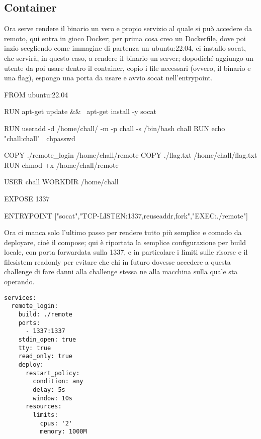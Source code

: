 \documentclass[main.tex]{subfiles}
\begin{document}
\subsection{Container}

Ora serve rendere il binario un vero e propio servizio al quale si può accedere da remoto, qui entra in gioco Docker; per prima cosa creo un Dockerfile, dove poi inzio scegliendo come immagine di partenza un ubuntu:22.04, ci installo socat, che servirà, in questo caso, a rendere il binario un server; dopodiché aggiungo un utente da poi usare dentro il container, copio i file necessari (ovvero, il binario e una flag), espongo una porta da usare e avvio socat nell'entrypoint.

\begin{python}
FROM ubuntu:22.04

RUN apt-get update && \
	apt-get install -y socat

RUN useradd -d /home/chall/ -m -p chall -s /bin/bash chall
RUN echo "chall:chall" | chpasswd

COPY ./remote_login /home/chall/remote
COPY ./flag.txt /home/chall/flag.txt
RUN chmod +x /home/chall/remote

USER chall
WORKDIR /home/chall

EXPOSE 1337

ENTRYPOINT ["socat","TCP-LISTEN:1337,reuseaddr,fork","EXEC:./remote"]
\end{python}

Ora ci manca solo l'ultimo passo per rendere tutto più semplice e comodo da deployare, cioè il compose; qui è riportata la semplice configurazione per build locale, con porta forwardata sulla 1337, e in particolare i limiti sulle risorse e il filesistem readonly per evitare che chi in futuro dovesse accedere a questa challenge di fare danni alla challenge stessa ne alla macchina sulla quale sta operando.

\begin{lstlisting}[style=yaml]
services:
  remote_login:
    build: ./remote
    ports:
      - 1337:1337
    stdin_open: true
    tty: true
    read_only: true
    deploy:
      restart_policy:
        condition: any
        delay: 5s
        window: 10s
      resources:
        limits:
          cpus: '2'
          memory: 1000M
\end{lstlisting}
\end{document}
